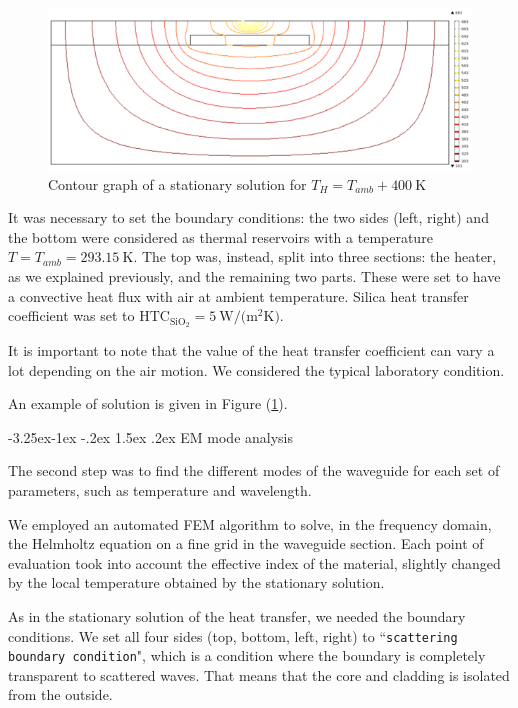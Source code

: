 \documentclass[12pt,a4paper,twoside]{article}
\makeatletter
\renewcommand\paragraph{
   \@startsection{paragraph}{4}{\z@}%
   {-3.25ex\@plus -1ex \@minus -.2ex}%
   {1.5ex \@plus .2ex}%
   {\normalfont\normalsize\bfseries}}
\makeatother
\begin{document}
\begin{figure}[!hb]
	\centering
	\includegraphics[width=1\textwidth]{thermal.png}
	\caption{Contour graph of a stationary solution for $T_H = T_{amb} + \SI{400}{\K}$}
	\label{fig_ex_thermal}
\end{figure}

It was necessary to set the boundary conditions: the two sides (left, right) and the bottom were considered as thermal reservoirs with a temperature $T = T_{amb} = \SI{293.15}{\K}$.
The top was, instead, split into three sections: the heater, as we explained previously, and the remaining two parts.
These were set to have a convective heat flux with air at ambient temperature.
Silica heat transfer coefficient was set to $\mathrm{HTC}_{\mathrm{SiO}_2} = \SI{5}{\W\per(\m^2\K)}$.

It is important to note that the value of the heat transfer coefficient can vary a lot depending on the air motion.
We considered the typical laboratory condition.

An example of solution is given in Figure (\ref{fig_ex_thermal}).

\paragraph{EM mode analysis}

The second step was to find the different modes of the waveguide for each set of parameters, such as temperature and wavelength.

We employed an automated FEM algorithm to solve, in the frequency domain, the Helmholtz equation on a fine grid in the waveguide section.
Each point of evaluation took into account the effective index of the material, slightly changed by the local temperature obtained by the stationary solution.

As in the stationary solution of the heat transfer, we needed the boundary conditions.
We set all four sides (top, bottom, left, right) to ``\texttt{scattering boundary condition}", which is a condition where the boundary is completely transparent to scattered waves.
That means that the core and cladding is isolated from the outside.
\end{document}
